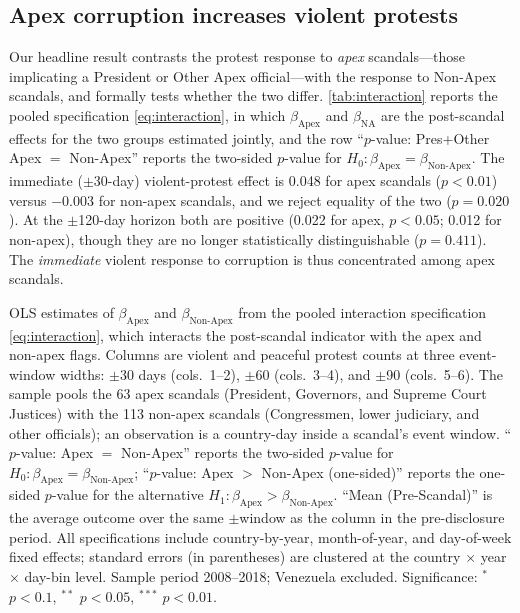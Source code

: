 \documentclass[11pt]{article}
\let\mathbetasym\beta
\renewcommand{\beta}{\ensuremath{\mathbetasym}}
\begin{document}
\subsection{Apex corruption increases violent protests}

Our headline result contrasts the protest response to \emph{apex} scandals---those implicating a President or Other Apex official---with the response to Non-Apex scandals, and formally tests whether the two differ. \autoref{tab:interaction} reports the pooled specification \autoref{eq:interaction}, in which $\beta_{\text{Apex}}$ and $\beta_{\text{NA}}$ are the post-scandal effects for the two groups estimated jointly, and the row ``$p$-value: Pres+Other Apex $=$ Non-Apex'' reports the two-sided $p$-value for $H_0:\beta_{\text{Apex}}=\beta_{\text{Non-Apex}}$. The immediate ($\pm$30-day) violent-protest effect is 0.048 for apex scandals ($p<0.01$) versus $-0.003$ for non-apex scandals, and we reject equality of the two ($p = 0.020$). At the $\pm$120-day horizon both are positive (0.022 for apex, $p<0.05$; 0.012 for non-apex), though they are no longer statistically distinguishable ($p = 0.411$). The \emph{immediate} violent response to corruption is thus concentrated among apex scandals.

\begin{table}[htb!]
    \caption{Apex scandals cause violent mobilization while Non-Apex scandals do not.}
    \label{tab:interaction}
    \begin{center}
        \scriptsize{}
    \end{center}
    \footnotesize{OLS estimates of $\beta_{\text{Apex}}$ and $\beta_{\text{Non-Apex}}$ from the pooled interaction specification \autoref{eq:interaction}, which interacts the post-scandal indicator with the apex and non-apex flags. Columns are violent and peaceful protest counts at three event-window widths: $\pm$30 days (cols.\ 1--2), $\pm$60 (cols.\ 3--4), and $\pm$90 (cols.\ 5--6). The sample pools the 63 apex scandals (President, Governors, and Supreme Court Justices) with the 113 non-apex scandals (Congressmen, lower judiciary, and other officials); an observation is a country-day inside a scandal's event window. ``$p$-value: Apex $=$ Non-Apex'' reports the two-sided $p$-value for $H_0:\beta_{\text{Apex}}=\beta_{\text{Non-Apex}}$; ``$p$-value: Apex $>$ Non-Apex (one-sided)'' reports the one-sided $p$-value for the alternative $H_1:\beta_{\text{Apex}}>\beta_{\text{Non-Apex}}$. ``Mean (Pre-Scandal)'' is the average outcome over the same $\pm$window as the column in the pre-disclosure period. All specifications include country-by-year, month-of-year, and day-of-week fixed effects; standard errors (in parentheses) are clustered at the country $\times$ year $\times$ day-bin level. Sample period 2008--2018; Venezuela excluded. Significance: $^{*}$ $p<0.1$, $^{**}$ $p<0.05$, $^{***}$ $p<0.01$.}
\end{table}
\end{document}
